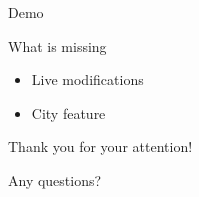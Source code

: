 \documentclass{beamer}
\begin{document}
\begin{frame}{Demo}
\end{frame}

\begin{frame}{What is missing}
  \begin{itemize}
    \item Live modifications
    \item City feature
  \end{itemize}
\end{frame}

\bgroup
{}
\begin{frame}[plain]{}
\end{frame}
\egroup

\begin{frame}
\begin{LARGE}
\begin{center}
  Thank you for your attention!
  
  \bigskip
  \bigskip
  
  Any questions?
    \end{center}
  \end{LARGE}
\end{frame}
\end{document}
